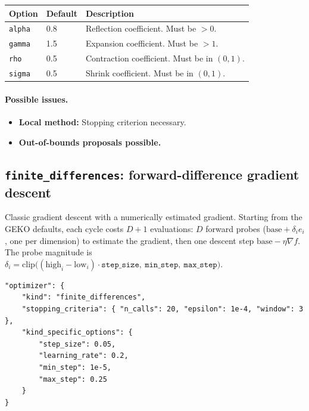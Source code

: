 \begin{center}
\begin{tabular}{@{}llp{8.5cm}@{}}
\toprule
Option & Default & Description \\
\midrule
\texttt{alpha} & 0.8 & Reflection coefficient. Must be $>0$. \\
\texttt{gamma} & 1.5 & Expansion coefficient. Must be $>1$. \\
\texttt{rho} & 0.5 & Contraction coefficient. Must be in $(0,1)$. \\
\texttt{sigma} & 0.5 & Shrink coefficient. Must be in $(0,1)$. \\
\bottomrule
\end{tabular}
\end{center}

\paragraph{Possible issues.}
\begin{itemize}
  \item \textbf{Local method:} Stopping criterion necessary.
  \item \textbf{Out-of-bounds proposals possible.}
\end{itemize}

\subsection{\texttt{finite\_differences}: forward-difference gradient descent}
\label{sec:opt-fd}

Classic gradient descent with a numerically estimated gradient.  Starting
from the GEKO defaults, each cycle costs $D{+}1$ evaluations: $D$ forward
probes ($\text{base} + \delta_i e_i$, one per dimension) to estimate the
gradient, then one descent step $\text{base} - \eta \nabla f$. The probe
magnitude is
$\delta_i = \mathrm{clip}\bigl((\mathrm{high}_i - \mathrm{low}_i)\cdot
\texttt{step\_size},\ \texttt{min\_step},\ \texttt{max\_step}\bigr)$.

\begin{lstlisting}
"optimizer": {
    "kind": "finite_differences",
    "stopping_criteria": { "n_calls": 20, "epsilon": 1e-4, "window": 3 },
    "kind_specific_options": {
        "step_size": 0.05,
        "learning_rate": 0.2,
        "min_step": 1e-5,
        "max_step": 0.25
    }
}
\end{lstlisting}


